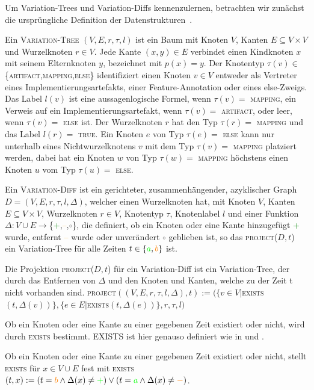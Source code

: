 Um Variation-Trees und Variation-Diffs kennenzulernen, betrachten wir zunächst die ursprüngliche Definition der Datenstrukturen~\cite{BTS+:ESECFSE22}.
\begin{definition}
	Ein \textsc{Variation-Tree}  $(V,E,r,\tau,l)$ ist ein Baum mit Knoten $V$, Kanten $E \subseteq V \times V$ und Wurzelknoten $r \in V$. Jede Kante $(x,y) \in E$ verbindet einen Kindknoten $x$ mit seinem Elternknoten $y$, bezeichnet mit $p(x) = y$. Der Knotentyp $\tau(v) \in $ \{\textsc{artifact,mapping,else}\} identifiziert einen Knoten $v \in V$ entweder als Vertreter eines Implementierungsartefakts, einer Feature-Annotation oder eines else-Zweigs. Das Label $l(v)$ ist eine aussagenlogische Formel, wenn $\tau(v) =$ \textsc{mapping}, ein Verweis auf ein Implementierungsartefakt, wenn $\tau(v) = $ \textsc{artifact}, oder leer, wenn $\tau(v) =$ \textsc{else} ist. Der Wurzelknoten $r$ hat den Typ $\tau(r) =$ \textsc{mapping} und das Label $l(r) = $ \textsc{true}. Ein Knoten $e$ von Typ $\tau(e) =$ \textsc{else} kann nur unterhalb eines Nichtwurzelknotens $v$ mit dem Typ $\tau(v) =$ \textsc{mapping} platziert werden, dabei hat ein Knoten $w$ von Typ $\tau(w) =$ \textsc{mapping} höchstens einen Knoten $u$ vom Typ $\tau(u) =$ \textsc{else}.
\end{definition}
\begin{definition}
	Ein \textsc{Variation-Diff} ist ein gerichteter, zusammenhängender, azyklischer Graph $D=(V,E,r,\tau,l,\Delta) $, welcher einen Wurzelknoten hat, mit Knoten $V$, Kanten $E \subseteq V \times V$, Wurzelknoten $r \in V$, Knotentyp $\tau$, Knotenlabel $l$ und einer Funktion $\Delta : V \cup E \to $\{\textcolor{green}{+},\textcolor{orange}{--},\textcolor{gray}{$\circ$}\}, die definiert, ob ein Knoten oder eine Kante hinzugefügt \textcolor{green}{+} wurde, entfernt \textcolor{orange}{--} wurde oder unverändert \textcolor{gray}{$\circ$} geblieben ist, so das \textsc{project}($D,t$) ein Variation-Tree für alle Zeiten $t \in \{\textcolor{green}{a},\textcolor{orange}{b}\}$ ist.
\end{definition}
\begin{definition}
	Die Projektion \textsc{project}($D,t$) für ein Variation-Diff ist ein Variation-Tree, der durch das Entfernen von $\Delta$ und den Knoten und Kanten, welche zu der Zeit t nicht vorhanden sind. \textsc{project}$((V,E,r,\tau,l,\Delta),t) := (\{v \in V | $\textsc{exists}$(t,\Delta(v))\},\{e \in E | $\textsc{exists}$(t,\Delta(e))\},r,\tau,l)$
\end{definition}
Ob ein Knoten oder eine Kante zu einer gegebenen Zeit existiert oder nicht, wird durch \textsc{exists} bestimmt. EXISTS ist hier genauso definiert wie in \cite{BTS+:ESECFSE22} und \cite{Moosherr23}. 
\begin{definition}
	Ob ein Knoten oder eine Kante zu einer gegebenen Zeit existiert oder nicht, stellt \textsc{exists}  für $x \in V \cup E$ fest mit \textsc{exists}$(t,x) := (t = \textcolor{orange}{b} \land \Delta(x) \neq \textcolor{green}{+}) \lor (t = \textcolor{green}{a} \land \Delta(x) \neq \textcolor{orange}{-})$.
\end{definition}

